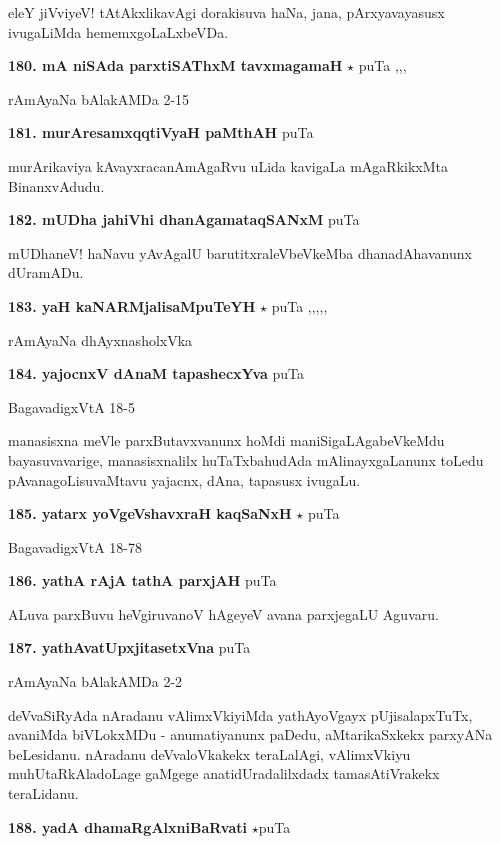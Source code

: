 eleY jiVviyeV! tAtAkxlikavAgi dorakisuva haNa, jana, pArxyavayasusx ivugaLiMda hememxgoLaLxbeVDa.

\medskip
\noindent\textbf{180. mA niSAda parxtiSAThxM tavxmagamaH} $\star$ \hfill puTa \pageref{20a},\pageref{157b},\pageref{166},\pageref{200}

\hfill rAmAyaNa bAlakAMDa 2-15

\medskip
\noindent\textbf{181. murAresamxqqtiVyaH paMthAH} \hfill puTa \pageref{43}

murArikaviya kAvayxracanAmAgaRvu uLida kavigaLa mAgaRkikxMta BinanxvAdudu.

\medskip
\noindent\textbf{182. mUDha jahiVhi dhanAgamataqSANxM} \hfill puTa \pageref{55a}

mUDhaneV! haNavu yAvAgalU barutitxraleVbeVkeMba dhanadAhavanunx dUramADu.

\medskip
\noindent\textbf{183. yaH kaNARMjalisaMpuTeYH} $\star$  \hfill puTa \pageref{152},\pageref{168a},\pageref{181b},\pageref{208a},\pageref{211e},\pageref{244a}

\hfill rAmAyaNa dhAyxnasholxVka 

\medskip
\noindent\textbf{184. yajocnxV dAnaM tapashecxYva} \hfill puTa \pageref{172}

\hfill BagavadigxVtA 18-5

manasisxna meVle parxButavxvanunx hoMdi maniSigaLAgabeVkeMdu bayasuvavarige, manasisxnalilx huTaTxbahudAda mAlinayxgaLanunx toLedu pAvanagoLisuvaMtavu yajacnx, dAna, tapasusx ivugaLu.

\medskip
\noindent\textbf{185. yatarx yoVgeVshavxraH kaqSaNxH} $\star$ \hfill puTa \pageref{92a}

\hfill BagavadigxVtA 18-78

\medskip
\noindent\textbf{186. yathA rAjA tathA parxjAH} \hfill puTa \pageref{225c}

ALuva parxBuvu heVgiruvanoV hAgeyeV avana parxjegaLU Aguvaru.

\medskip
\noindent\textbf{187. yathAvatUpxjitasetxVna} \hfill puTa \pageref{197}

\hfill rAmAyaNa bAlakAMDa 2-2

deVvaSiRyAda nAradanu vAlimxVkiyiMda yathAyoVgayx pUjisalapxTuTx, avaniMda biVLokxMDu - anumatiyanunx paDedu, aMtarikaSxkekx parxyANa beLesidanu. nAradanu deVvaloVkakekx  teraLalAgi, vAlimxVkiyu muhUtaRkAladoLage gaMgege anatidUradalilxdadx tamasAtiVrakekx teraLidanu.

\medskip
\noindent\textbf{188. yadA dhamaRgAlxniBaRvati} $\star$\hfill puTa \pageref{150b}

